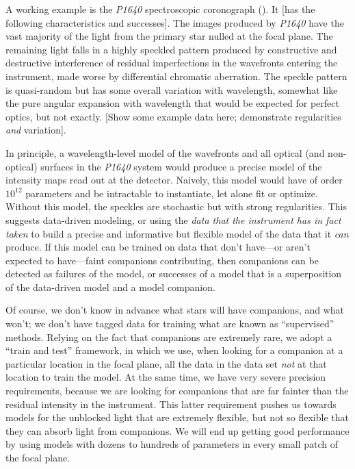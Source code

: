 \documentclass[12pt,pdftex,preprint]{aastex}
\newcommand{\project}[1]{\textsl{#1}}
\begin{document}
A working example is the \project{P1640} spectroscopic coronograph
(\citealt{p1640}).  It [has the following characteristics and
  successes].  The images produced by \project{P1640} have the vast
majority of the light from the primary star nulled at the focal plane.
The remaining light falls in a highly speckled pattern produced by
constructive and destructive interference of residual imperfections in
the wavefronts entering the instrument, made worse by differential
chromatic aberration.  The speckle pattern is quasi-random but has
some overall variation with wavelength, somewhat like the pure angular
expansion with wavelength that would be expected for perfect optics,
but not exactly. [Show some example data here; demonstrate
  regularities \emph{and} variation].

In principle, a wavelength-level model of the wavefronts and all
optical (and non-optical) surfaces in the \project{P1640} system would
produce a precise model of the intensity maps read out at the
detector.  Naively, this model would have of order $10^{12}$
parameters and be intractable to instantiate, let alone fit or
optimize.  Without this model, the speckles are stochastic but with
strong regularities.  This suggests data-driven modeling, or using the
\emph{data that the instrument has in fact taken} to build a precise
and informative but flexible model of the data that it \emph{can}
produce.  If this model can be trained on data that don't have---or
aren't expected to have---faint companions contributing, then
companions can be detected as failures of the model, or successes of a
model that is a superposition of the data-driven model and a model
companion.

Of course, we don't know in advance what stars will have companions,
and what won't; we don't have tagged data for training what are known
as ``supervised'' methods.  Relying on the fact that companions are
extremely rare, we adopt a ``train and test'' framework, in which we
use, when looking for a companion at a particular location in the
focal plane, all the data in the data set \emph{not} at that location
to train the model.  At the same time, we have very severe precision
requirements, because we are looking for companions that are far
fainter than the residual intensity in the instrument.  This latter
requirement pushes us towards models for the unblocked light that are
extremely flexible, but not so flexible that they can absorb light
from companions.  We will end up getting good performance by using
models with dozens to hundreds of parameters in every small patch of
the focal plane.
\end{document}
